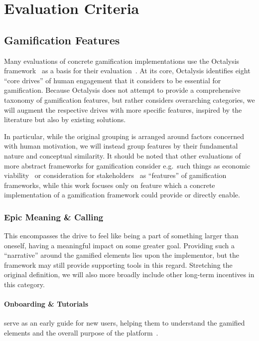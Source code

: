 \documentclass[runningheads]{llncs}
\begin{document}
\section{Evaluation Criteria}

\subsection{Gamification Features}

Many evaluations of concrete gamification implementations use the Octalysis framework~\cite{Chou15} as a basis for their evaluation~\cite{SANCN24, EDPKM15, ChrWa21, MohaB23}. At its core, Octalysis identifies eight \enquote{core drives} of human engagement that it considers to be essential for gamification. Because Octalysis does not attempt to provide a comprehensive taxonomy of gamification features, but rather considers overarching categories, we will augment the respective drives with more specific features, inspired by the literature but also by existing solutions.

In particular, while the original grouping is arranged around factors concerned with human motivation, we will instead group features by their fundamental nature and conceptual similarity. It should be noted that other evaluations of more abstract frameworks for gamification consider e.g.~such things as economic viability~\cite{GearB13} or consideration for stakeholders~\cite{HeAWS15} as \enquote{features} of gamification frameworks, while this work focuses only on feature which a concrete implementation of a gamification framework could provide or directly enable.

\subsubsection{Epic Meaning \& Calling}\cite{Chou15} This encompasses the drive to feel like being a part of something larger than oneself, having a meaningful impact on some greater goal. Providing such a \enquote{narrative} around the gamified elements lies upon the implementor, but the framework may still provide supporting tools in this regard. Stretching the original definition, we will also more broadly include other long-term incentives in this category.

\paragraph{Onboarding \& Tutorials} serve as an early guide for new users, helping them to understand the gamified elements and the overall purpose of the platform~\cite{Herz14}.
\end{document}
